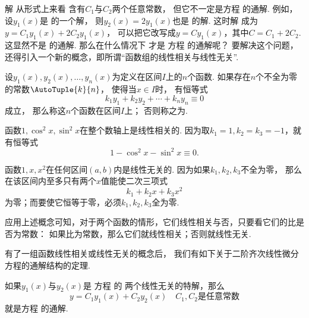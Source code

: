 解  从形式上来看
含有\(C_1\)与\(C_2\)两个任意常数，
但它不一定是方程  的通解.
例如，设\(y_1(x)\)是  的一个解，
则\(y_2(x)=2 y_1(x)\)也是  的解.
这时解  成为\(y = C_1 y_1(x) + 2 C_2 y_1(x)\)，
可以把它改写成\(y = C y_1(x)\)，其中\(C = C_1 + 2 C_2\).
这显然不是  的通解.
那么在什么情况下  才是%
方程  的通解呢？
要解决这个问题，还得引入一个新的概念，即所谓“函数组的线性相关与线性无关”.

\begin{definition}
设\(y_1(x),y_2(x),\dotsc,y_n(x)\)为定义在区间\(I\)上的\(n\)个函数.
如果存在\(n\)个不全为零的常数\(\AutoTuple{k}{n}\)，
使得当\(x \in I\)时，
有恒等式\[
	k_1 y_1+k_2 y_2+ \dotsb +k_n y_n \equiv 0
\]成立，
那么称这\(n\)个函数在区间\(I\)上；
否则称之为.
\end{definition}

\begin{example}
函数\(1,\cos^2 x, \sin^2 x\)在整个数轴上是线性相关的.
因为取\(k_1=1,k_2=k_3=-1\)，就有恒等式\[
	1 - \cos^2 x - \sin^2 x \equiv 0.
\]

函数\(1,x,x^2\)在任何区间\((a,b)\)内是线性无关的.
因为如果\(k_1,k_2,k_3\)不全为零，
那么在该区间内至多只有两个\(x\)值能使二次三项式\[
	k_1 + k_2 x + k_3 x^2
\]为零；而要使它恒等于零，必须\(k_1,k_2,k_3\)全为零.
\end{example}

应用上述概念可知，对于两个函数的情形，它们线性相关与否，只要看它们的比是否为常数：
如果比为常数，那么它们就线性相关；否则就线性无关.

有了一组函数线性相关或线性无关的概念后，
我们有如下关于二阶齐次线性微分方程的通解结构的定理.
\begin{theorem}\label{theorem:微分方程.二阶齐次线性微分方程的通解结构}
如果\(y_1(x)\)与\(y_2(x)\)是
方程  的
两个线性无关的特解，那么\[
	y = C_1 y_1(x) + C_2 y_2(x)
	\quad\text{\(C_1,C_2\)是任意常数}
\]
就是方程  的通解.
\end{theorem}

